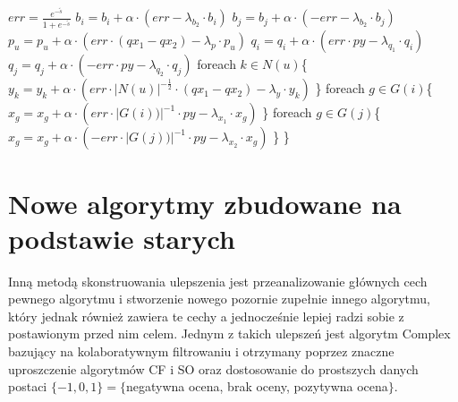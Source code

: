 \documentclass{pracamgr}
\begin{document}
     \hspace*{32pt}		$err=\frac{e^{-\tilde{s}}}{1+e^{-\tilde{s}}}$\newline
     \hspace*{32pt}		$b_i=b_i+\alpha\cdot(err-\lambda_{b_2}\cdot b_i)$\newline     
     \hspace*{32pt}		$b_j=b_j+\alpha\cdot(-err-\lambda_{b_2}\cdot b_j)$\newline
     \hspace*{32pt}		$p_u=p_u+\alpha\cdot(err\cdot (qx_1-qx_2)-\lambda_p\cdot p_u)$\newline
     \hspace*{32pt}		$q_i=q_i+\alpha\cdot(err\cdot py-\lambda_{q_1}\cdot q_i)$\newline     
     \hspace*{32pt}		$q_j=q_j+\alpha\cdot(-err\cdot py-\lambda_{q_2}\cdot q_j)$\newline
     \hspace*{32pt}		foreach $k\in N(u)$\{\newline
     \hspace*{48pt}			$y_k=y_k+\alpha\cdot(err\cdot |N(u)|^{-\frac{1}{2}}\cdot(qx_1-qx_2)-\lambda_y\cdot y_k)$\newline
     \hspace*{32pt}		\}\newline    
     \hspace*{32pt}		foreach $g\in G(i)$\{\newline
     \hspace*{48pt}			$x_g=x_g+\alpha\cdot(err\cdot |G(i))|^{-1}\cdot py-\lambda_{x_1}\cdot x_g)$\newline
     \hspace*{32pt}		\}\newline
     \hspace*{32pt}		foreach $g\in G(j)$\{\newline
     \hspace*{48pt}			$x_g=x_g+\alpha\cdot(-err\cdot |G(j))|^{-1}\cdot py-\lambda_{x_2}\cdot x_g)$\newline
     \hspace*{32pt}		\}\newline
     \hspace*{16pt}	\}\newline
  \section{Nowe algorytmy zbudowane na podstawie starych}
   Inną metodą skonstruowania ulepszenia jest przeanalizowanie głównych cech pewnego algorytmu i stworzenie nowego pozornie zupełnie innego algorytmu,
   który jednak również zawiera te cechy a jednocześnie lepiej radzi sobie z postawionym przed nim celem.\newline
   Jednym z takich ulepszeń jest algorytm Complex bazujący na kolaboratywnym filtrowaniu i otrzymany poprzez znaczne uproszczenie algorytmów CF i SO
   oraz dostosowanie do prostszych danych postaci $\{-1,0,1\}=\{$negatywna ocena, brak oceny, pozytywna ocena$\}$.
\end{document}
